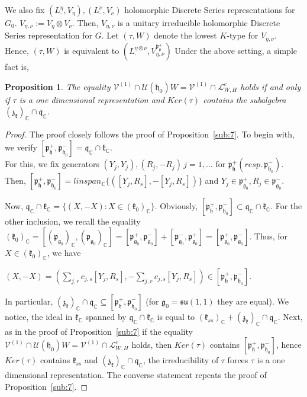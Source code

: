 \documentclass[12pt]{amsart}
\newtheorem{prop}[thm]{Proposition}
\theoremstyle{definition}
\theoremstyle{remark}
\newcommand{\g}{\mathfrak{g}}
\newcommand{\h}{\mathfrak{h}}
\renewcommand{\k}{{\mathfrak k}}
\newcommand{\p}{\mathfrak p}
\newcommand{\q}{\mathfrak q}
\newcommand{\z}{\mathfrak z}
\newcommand{\C}{{\mathbb C}}
\numberwithin{equation}{section}
\begin{document}
  We also fix $(L_\cdot^\eta,  V_\eta), (L_\cdot^\nu, V_\nu)$ holomorphic Discrete Series representations for $G_0$.
   $V_{\eta,\nu}:= V_\eta \otimes V_\nu $. Then, $V_{\eta,\nu}$ is a unitary irreducible holomorphic Discrete Series representation for $G$.
 Let $(\tau, W)$ denote the lowest $K$-type for $V_{\eta,\nu}$. Hence, $(\tau, W)$ is equivalent to $(L_\cdot^{\eta \otimes \nu}, V_{\eta,\nu}^{\p_\g^+})$ Under the above setting, a simple fact is,
\begin{prop} \label{prop:nu1fortensor} The equality
 $\mathcal V^{(1)} \cap \mathcal U(\h_0)W =\mathcal V^{(1)} \cap \mathcal L_{W,H}^c$ holds  if and only if $\tau$ is a one dimensional representation and $Ker(\tau)$ contains the subalgebra $(\z_\k)_\C  \cap \q_\C$.
\end{prop}
 \begin{proof}The  proof closely  follows the proof of Proposition~\ref{sub:7}. To begin with, we verify $[\p_\h^+, \p_{\h_0}^-]=\q_\C \cap \k_\C$. \\ For this,  we fix generators $(Y_j, Y_j),  (R_j, -R_j) \,  j=1,\dots $ for $\p_{\h}^+ (resp. \,\p_{\h_0}^-) $. Then, $[\p_\h^+, \p_{\h_0}^-] =linspan_\C \{ ([Y_j, R_s], -[Y_j, R_s]) \} $ and $Y_j \in  \p_{\g_0}^+, R_j \in \p_{\g_0}^-$.






  Now, $\q_\C \cap \k_\C =\{ (X,-X): X\in (\k_0)_\C \}$. Obviously, $[\p_\h^+, \p_{\h_0}^-]\subset \q_\C \cap \k_\C$. For the other inclusion, we recall the equality $(\k_0)_\C =[(\p_{\g_0})_\C, (\p_{\g_0})_\C]=[\p_{\g_0}^+, \p_{\g_0}^-] +[\p_{\g_0}^-, \p_{\g_0}^+]= [\p_{\g_0}^+, \p_{\g_0}^-] $.
Thus, for $X\in (\k_0)_\C $,  we have

  $(X,-X)=(\sum_{j,r} c_{j,s} [Y_j,R_s], - \sum_{j,r}  c_{j,s} [Y_j,R_s] )\in [\p_\h^+, \p_{\h_0}^-] $.

  In particular, $(\z_\k)_\C  \cap \q_\C \subseteq   [\p_\h^+, \p_{\h_0}^-]$ (for $\g_0=\mathfrak{su}(1,1)$ they are equal).  We notice,  the ideal in $\k_\C$ spanned by $\q_\C \cap \k_\C$ is equal to $(\k_{ss})_\C +(\z_\k)_\C  \cap \q_\C $. Next, as in the proof of Proposition~\ref{sub:7} if the equality $\mathcal V^{(1)} \cap \mathcal U(\h_0)W =\mathcal V^{(1)} \cap \mathcal L_{W,H}^c$ holds, then $Ker(\tau)$ contains  $[\p_\h^+, \p_{\h_0}^-] $, hence $Ker(\tau)$  contains $\k_{ss}$ and $(\z_\k)_\C  \cap \q_\C$, the irreducibility of $\tau$ forces $\tau$  is a one dimensional representation. The converse statement repeats the proof of Proposition~\ref{sub:7}.
\end{proof}
\end{document}
